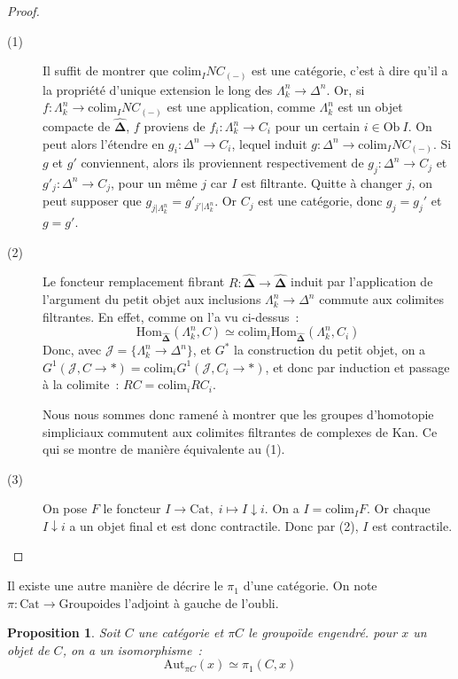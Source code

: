 \documentclass{amsart}
\theoremstyle{plain}
\newtheorem{prop}[theo]{Proposition}
\theoremstyle{definition}
\theoremstyle{remark}
\newcommand{\Ob}[1]{\mathrm{Ob}\:#1}
\newcommand{\Hom}[3]{\mathrm{Hom}_{#1}(#2,#3)}
\newcommand{\DEns}{\widehat{\mathbf{\Delta}}}
\newcommand{\Cat}{\mathrm{Cat}}
\newcommand{\colim}{\mathrm{colim}}
\newcommand{\ra}{\rightarrow}
\begin{document}
\begin{proof}
  \begin{description}
    \item[(1)] Il suffit de montrer que $\colim_I NC_{(-)}$ est une catégorie, c'est à dire qu'il a la propriété d'unique extension le long
               des $\Lambda_k^n\ra\Delta^n$. Or, si $f:\Lambda_k^n\ra \colim_I NC_{(-)}$ est une application, comme $\Lambda_k^n$ est un objet
               compacte de $\DEns$, $f$ proviens de $f_i:\Lambda_k^n\ra C_i$ pour un certain $i\in \Ob I$. On peut alors l'étendre en
               $g_i:\Delta^n\ra C_i$, lequel induit $g:\Delta^n\ra \colim_I NC_{(-)}$. Si $g$ et $g'$ conviennent, alors ils proviennent
               respectivement de $g_j:\Delta^n\ra C_j$ et $g'_j:\Delta^n\ra C_j$, pour un même $j$ car $I$ est filtrante.
               Quitte à changer $j$, on peut supposer que $g_{j|\Lambda_k^n}=g'_{j'|\Lambda_k^n}$. Or $C_j$ est une catégorie, 
               donc $g_j=g_j'$ et $g=g'$.
    \item[(2)] Le foncteur remplacement fibrant $R:\DEns\ra \DEns$ induit par l'application de l'argument du petit objet aux inclusions
               $\Lambda_k^n\ra\Delta^n$ commute aux colimites filtrantes. En effet, comme on l'a vu ci-dessus~:
               $$\Hom{\DEns}{\Lambda_k^n}{C}\simeq \colim_i\Hom{\DEns}{\Lambda_k^n}{C_i}$$
               Donc, avec $\mathcal{J}=\{\Lambda_k^n\ra\Delta^n\}$, et $G^*$ la construction du petit objet,
               on a $G^1(\mathcal{J},C\ra *)=\colim_i G^1(\mathcal{J},C_i\ra *)$, et donc par induction et passage à la colimite~:
               $RC = \colim_i RC_i$.

               Nous nous sommes donc ramené à montrer que les groupes d'homotopie simpliciaux commutent aux colimites filtrantes de complexes de Kan.
               Ce qui se montre de manière équivalente au (1).
    \item[(3)] On pose $F$ le foncteur $I\ra \Cat,\;i\mapsto I\downarrow i$. On a $I=\colim_I F$. Or chaque $I\downarrow i$ a un objet final et 
               est donc contractile. Donc par (2), $I$ est contractile.
  \end{description}
\end{proof}

Il existe une autre manière de décrire le $\pi_1$ d'une catégorie. On note $\pi:\Cat \ra \mathrm{Groupoides}$ l'adjoint à gauche de l'oubli.

\begin{prop}\label{pi1categorie}
  Soit $C$ une catégorie et $\pi C$ le groupoïde engendré. pour $x$ un objet de $C$, on a un isomorphisme~:
  $$\mathrm{Aut}_{\pi C}(x)\simeq \pi_1(C,x)$$
\end{prop}
\end{document}
